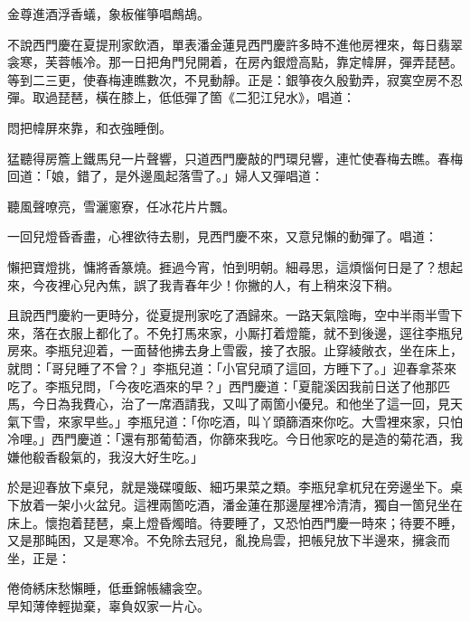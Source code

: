 \begin{myquote}
金尊進酒浮香蟻，象板催箏唱鷓鴣。
\end{myquote}

不說西門慶在夏提刑家飲酒，單表潘金蓮見西門慶許多時不進他房裡來，每日翡翠衾寒，芙蓉帳冷。那一日把角門兒開着，在房內銀燈高點，靠定幃屏，彈弄琵琶。等到二三更，使春梅連瞧數次，不見動靜。正是：銀箏夜久殷勤弄，寂寞空房不忍彈。取過琵琶，橫在膝上，低低彈了箇《二犯江兒水》，唱道：

\begin{myquote}
悶把幃屏來靠，和衣強睡倒。
\end{myquote}

猛聽得房簷上鐵馬兒一片聲響，只道西門慶敲的門環兒響，連忙使春梅去瞧。春梅回道：「娘，錯了，是外邊風起落雪了。」{}婦人又彈唱道：

\begin{myquote}
聽風聲嘹亮，雪灑窻寮，任冰花片片飄。
\end{myquote}

一回兒燈昏香盡，心裡欲待去剔，見西門慶不來，又意兒懶的動彈了。唱道：

\begin{myquote}
懶把寶燈挑，慵將香篆燒。捱過今宵，怕到明朝。細尋思，這煩惱何日是了？想起來，今夜裡心兒內焦，誤了我青春年少！你撇的人，有上稍來沒下稍。
\end{myquote}

且說西門慶約一更時分，從夏提刑家吃了酒歸來。一路天氣陰晦，空中半雨半雪下來，落在衣服上都化了。不免打馬來家，小厮打着燈籠，就不到後邊，逕往李瓶兒房來。李瓶兒迎着，一面替他拂去身上雪霰，接了衣服。止穿綾敞衣，坐在床上，就問：「哥兒睡了不曾？」李瓶兒道：「小官兒頑了這回，方睡下了。」迎春拿茶來吃了。李瓶兒問，「今夜吃酒來的早？」西門慶道：「夏龍溪因我前日送了他那匹馬，今日為我費心，治了一席酒請我，又叫了兩箇小優兒。和他坐了這一回，見天氣下雪，來家早些。」李瓶兒道：「你吃酒，叫丫頭篩酒來你吃。大雪裡來家，只怕冷哩。」西門慶道：「還有那葡萄酒，你篩來我吃。今日他家吃的是造的菊花酒，我嫌他殽香殽氣的，我沒大好生吃。」

於是迎春放下桌兒，就是幾碟嗄飯、細巧果菜之類。李瓶兒拿杌兒在旁邊坐下。桌下放着一架小火盆兒。這裡兩箇吃酒，潘金蓮在那邊屋裡冷清清，獨自一箇兒坐在床上。懷抱着琵琶，桌上燈昏燭暗。待要睡了，又恐怕西門慶一時來；待要不睡，又是那盹困，又是寒冷。不免除去冠兒，亂挽烏雲，把帳兒放下半邊來，擁衾而坐，正是：

\begin{myquote}
倦倚綉床愁懶睡，低垂錦帳繡衾空。\\早知薄倖輕拋棄，辜負奴家一片心。
\end{myquote}

